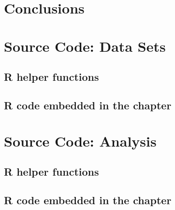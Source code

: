\documentclass[draftthesis]{neiuthesis}
\begin{document}
\mainmatter

\todototoc
\listoftodos





\chapter{Conclusions}
\label{cha:conclusions}



\backmatter



\appendix

\chapter{Source Code: Data Sets}

\section*{R helper functions}


\section*{R code embedded in the chapter}


\chapter{Source Code: Analysis}

\section*{R helper functions}


\section*{R code embedded in the chapter}

\end{document}
